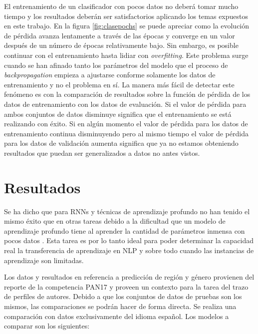 El entrenamiento de un clasificador con pocos datos no deberá tomar mucho tiempo y los resultados deberán ser satisfactorios aplicando los temas expuestos en este trabajo. En la figura \ref{fig:clasepochs} se puede apreciar como la evolución de pérdida avanza lentamente a través de las épocas y converge en un valor después de un número de épocas relativamente bajo. Sin embargo, es posible continuar con el entrenamiento hasta lidiar con \textit{overfitting}. Este problema surge cuando se han afinado tanto los parámetros del modelo que el proceso de \textit{backpropagation} empieza a ajustarse conforme solamente los datos de entrenamiento y no el problema en sí. La manera más fácil de detectar este fenómeno es con la comparación de resultados sobre la función de pérdida de los datos de entrenamiento con los datos de evaluación. Si el valor de pérdida para ambos conjuntos de datos disminuye significa que el entrenamiento se está realizando con éxito. Si en algún momento el valor de pérdida para los datos de entrenamiento continua disminuyendo pero al mismo tiempo el valor de pérdida para los datos de validación aumenta significa que ya no estamos obteniendo resultados que puedan ser generalizados a datos no antes vistos.

\section{Resultados}

Se ha dicho que para RNNs y técnicas de aprendizaje profundo no han tenido el mismo éxito que en otras tareas debido a la dificultad que un modelo de aprendizaje profundo tiene al aprender la cantidad de parámetros inmensa con pocos datos \parencite{zampieri2017, malmasi2016discriminating}. Esta tarea es por lo tanto ideal para poder determinar la capacidad real la transferencia de aprendizaje en NLP y sobre todo cuando las instancias de aprendizaje son limitadas.

Los datos y resultados en referencia a predicción de región y género provienen del reporte de la competencia PAN17 \parencite{rangel2017overview} y proveen un contexto para la tarea del trazo de perfiles de autores. Debido a que los conjuntos de datos de pruebas son los mismos, las comparaciones se podrán hacer de forma directa. Se realiza una comparación con datos exclusivamente del idioma español. Los modelos a comparar son los siguientes:

